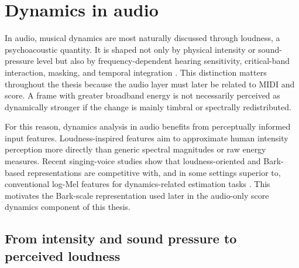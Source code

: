 \section{Dynamics in audio}
\label{sec:bg:dynamics:audio}

In audio, musical dynamics are most naturally discussed through loudness, a psychoacoustic quantity. It is shaped not only by physical intensity or sound-pressure level but also by frequency-dependent hearing sensitivity, critical-band interaction, masking, and temporal integration \cite{zwicker2007psychoacoustics}. This distinction matters throughout the thesis because the audio layer must later be related to MIDI and score. A frame with greater broadband energy is not necessarily perceived as dynamically stronger if the change is mainly timbral or spectrally redistributed.

For this reason, dynamics analysis in audio benefits from perceptually informed input features. Loudness-inspired features aim to approximate human intensity perception more directly than generic spectral magnitudes or raw energy measures. Recent singing-voice studies show that loudness-oriented and Bark-based representations are competitive with, and in some settings superior to, conventional log-Mel features for dynamics-related estimation tasks \cite{narang2022analysis,narang2024automatic}. This motivates the Bark-scale representation used later in the audio-only score dynamics component of this thesis.

\subsection{From intensity and sound pressure to perceived loudness}

